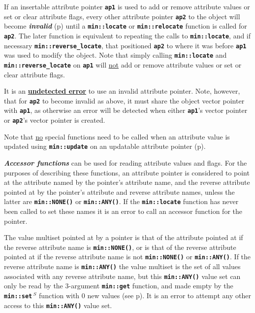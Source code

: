 \documentclass[12pt]{article}
\newcommand{\TT}[1]{{\tt \bfseries #1}}
\newcommand{\mkey}[2]{{\bf \em #1}\index{#1!#2}}
\newcommand{\ikey}[2]{{\bf \em #1}\index{#2}}
\newcommand{\pagref}[1]{p\pageref{#1}}
\newcommand{\EOL}{\penalty \exhyphenpenalty}
\newcommand{\RESIZE}{$\,^S$}
\begin{document}
If an insertable attribute pointer \TT{ap1} is used
to add or remove attribute values or set or clear attribute flags,
every other attribute pointer \TT{ap2}
to the object will become \mkey{invalid}{attribute pointer}
(\pagref{INSERTABLE-ATTRIBUTE-FUNCTIONS})
until a \TT{min::\EOL locate} or
\TT{min::\EOL relocate} function is called for \TT{ap2}.  The later
function is equivalent to repeating the calls to \TT{min::\EOL locate},
and if necessary \TT{min::\EOL reverse\_\EOL locate}, that positioned
\TT{ap2} to where it was before \TT{ap1} was used to modify the object.
Note that simply calling \TT{min::\EOL locate}
and \TT{min::\EOL reverse\_\EOL locate} on \TT{ap1} will
\underline{not} add or remove attribute values or set or clear attribute flags.

It is an \underline{\bf undetected error}
to use an invalid attribute pointer.  Note, however, that for \TT{ap2}
to become invalid as above, it must share the object vector pointer
with \TT{ap1}, as otherwise an error will be detected when either
\TT{ap1}'s vector pointer or \TT{ap2}'s vector pointer is created.

Note that \underline{no} special functions need to be called when an attribute
value is updated using \TT{min::\EOL update} on
an updatable attribute pointer (\pagref{UPDATABLE-ATTRIBUTE-FUNCTIONS}).

\ikey{Accessor functions}{accessor function}
can be used for reading attribute values and flags.
For the purposes of describing these functions,
an attribute pointer is considered to point at the attribute
named by the pointer's attribute name, and the reverse attribute
pointed at by the pointer's attribute and reverse attribute names,
unless the latter are \TT{min::NONE()} or \TT{min::ANY()}.
If the \TT{min::\EOL locate} function has never been called to set
these names it is an error to call an accessor
function for the pointer.

The value multiset pointed at by a pointer is that of the attribute pointed
at if the reverse attribute name is \TT{min::NONE()}, or is that of
the reverse attribute pointed at if the reverse attribute name is not
\TT{min::NONE()} or \TT{min::ANY()}.
If the reverse attribute name is \TT{min::ANY()}
\label{REVERSE-ATTRIBUTE-NAME-ANY} the value multiset is
the set of all values associated with any reverse attribute name, but
this \TT{min::ANY()}
value set can only be read by the 3-argument \TT{min::get}
function, and made empty by the \TT{min::\EOL set\RESIZE}
function with 0 new values (see \pagref{MIN::SET_DELETE_ANY}).
It is an error to attempt any other access to this \TT{min::ANY()} value set.
\end{document}
